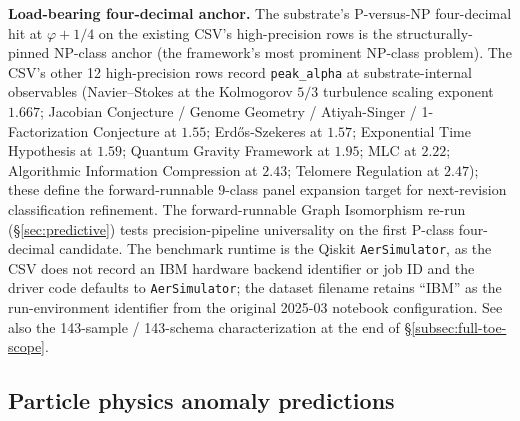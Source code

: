 \documentclass[11pt,a4paper]{amsart}
\theoremstyle{plain}
\theoremstyle{definition}
\begin{document}
\textbf{Load-bearing four-decimal anchor.} The substrate's P-versus-NP four-decimal hit at $\varphi + 1/4$ on the existing CSV's high-precision rows is the structurally-pinned NP-class anchor (the framework's most prominent NP-class problem). The CSV's other 12 high-precision rows record \texttt{peak\_alpha} at substrate-internal observables (Navier--Stokes at the Kolmogorov $5/3$ turbulence scaling exponent $1.667$; Jacobian Conjecture / Genome Geometry / Atiyah-Singer / 1-Factorization Conjecture at $1.55$; Erd\H{o}s-Szekeres at $1.57$; Exponential Time Hypothesis at $1.59$; Quantum Gravity Framework at $1.95$; MLC at $2.22$; Algorithmic Information Compression at $2.43$; Telomere Regulation at $2.47$); these define the forward-runnable 9-class panel expansion target for next-revision classification refinement. The forward-runnable Graph Isomorphism re-run (\S\ref{sec:predictive}) tests precision-pipeline universality on the first P-class four-decimal candidate. The benchmark runtime is the Qiskit \texttt{AerSimulator}, as the CSV does not record an IBM hardware backend identifier or job ID and the driver code defaults to \texttt{AerSimulator}; the dataset filename retains ``IBM'' as the run-environment identifier from the original 2025-03 notebook configuration. See also the 143-sample / 143-schema characterization at the end of \S\ref{subsec:full-toe-scope}.

\subsection{Particle physics anomaly predictions}
\end{document}
